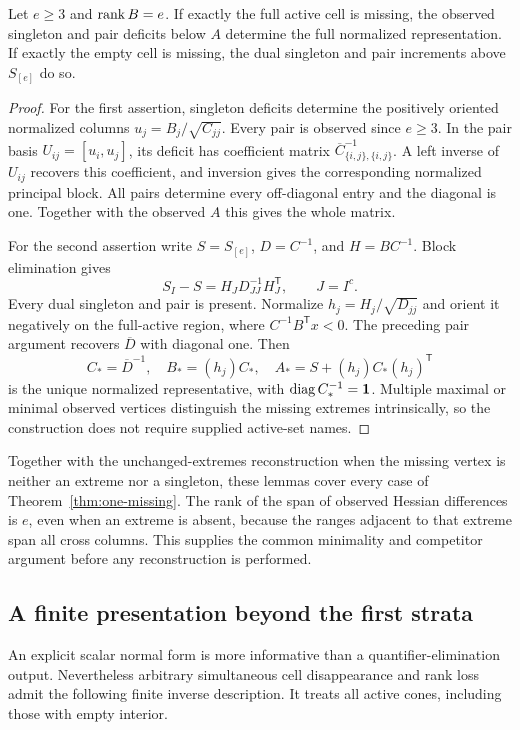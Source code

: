 \begin{lemma}\label{lem:missing-extreme}
Let $e\ge3$ and $\operatorname{rank} B=e$. If exactly the full active cell is missing, the observed singleton and pair deficits below $A$ determine the full normalized representation. If exactly the empty cell is missing, the dual singleton and pair increments above $S_{[e]}$ do so.
\end{lemma}
\begin{proof}
For the first assertion, singleton deficits determine the positively oriented normalized columns $u_j=B_j/\sqrt{C_{jj}}$. Every pair is observed since $e\ge3$. In the pair basis $U_{ij}=[u_i,u_j]$, its deficit has coefficient matrix $\overline C_{\{i,j\},\{i,j\}}^{-1}$. A left inverse of $U_{ij}$ recovers this coefficient, and inversion gives the corresponding normalized principal block. All pairs determine every off-diagonal entry and the diagonal is one. Together with the observed $A$ this gives the whole matrix.

For the second assertion write $S=S_{[e]}$, $D=C^{-1}$, and $H=BC^{-1}$. Block elimination gives
\[
 S_I-S=H_JD_{JJ}^{-1}H_J^{\mathsf T},\qquad J=I^c.
\]
Every dual singleton and pair is present. Normalize $h_j=H_j/\sqrt{D_{jj}}$ and orient it negatively on the full-active region, where $C^{-1}B^{\mathsf T}x<0$. The preceding pair argument recovers $\overline D$ with diagonal one. Then
\[
 C_*=\overline D^{-1},\quad B_*=(h_j)C_*,\quad
 A_*=S+(h_j)C_*(h_j)^{\mathsf T}
\]
is the unique normalized representative, with $\operatorname{diag} C_*^{-1}=\mathbf1$. Multiple maximal or minimal observed vertices distinguish the missing extremes intrinsically, so the construction does not require supplied active-set names.
\end{proof}

Together with the unchanged-extremes reconstruction when the missing vertex is neither an extreme nor a singleton, these lemmas cover every case of Theorem~\ref{thm:one-missing}. The rank of the span of observed Hessian differences is $e$, even when an extreme is absent, because the ranges adjacent to that extreme span all cross columns. This supplies the common minimality and competitor argument before any reconstruction is performed.

\subsection{A finite presentation beyond the first strata}
An explicit scalar normal form is more informative than a quantifier-elimination output. Nevertheless arbitrary simultaneous cell disappearance and rank loss admit the following finite inverse description. It treats all active cones, including those with empty interior.

